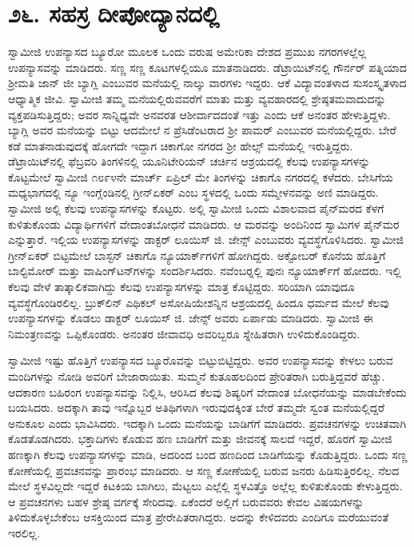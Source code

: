 
\chapter*{೨೬. ಸಹಸ್ರ ದೀಪೋದ್ಯಾನದಲ್ಲಿ}

 ಸ್ವಾಮೀಜಿ ಉಪನ್ಯಾಸದ ಬ್ಯೂರೋ ಮೂಲಕ ಒಂದು ವರುಷ ಅಮೇರಿಕಾ ದೇಶದ ಪ್ರಮುಖ ನಗರಗಳಲ್ಲೆಲ್ಲ ಉಪನ್ಯಾಸವನ್ನು ಮಾಡಿದರು. ಸಣ್ಣ ಸಣ್ಣ ಕೂಟಗಳಲ್ಲಿಯೂ ಮಾತನಾಡಿದರು. ಡೆಟ್ರಾಯಿಟ್‍ನಲ್ಲಿ ಗೌರ್ನರ್ ಪತ್ನಿಯಾದ ಶ‍್ರೀಮತಿ ಜಾನ್ ಜೀ ಬ್ಯಾಗ್ಲಿ ಎಂಬುವರ ಮನೆಯಲ್ಲಿ ನಾಲ್ಕು ವಾರಗಳು ಇದ್ದರು. ಆಕೆ ವಿದ್ಯಾವಂತಳಾದ ಸುಸಂಸ್ಕೃತಳಾದ ಆಧ್ಯಾತ್ಮಿಕ ಜೀವಿ. ಸ್ವಾಮೀಜಿ ತಮ್ಮ ಮನೆಯಲ್ಲಿರುವವರೆಗೆ ಮಾತು ಮತ್ತು ವ್ಯವಹಾರದಲ್ಲಿ ಶ್ರೇಷ್ಠತಮವಾದುದನ್ನು ವ್ಯಕ್ತಪಡಿಸುತ್ತಿದ್ದರು; ಅವರ ಸಾನ್ನಿಧ್ಯವೇ ಅನವರತ ಆಶೀರ್ವಾದದಂತೆ ಇತ್ತು ಎಂದು ಆಕೆ ಅನಂತರ ಹೇಳುತ್ತಿದ್ದಳು. ಬ್ಯಾಗ್ಲಿ ಅವರ ಮನೆಯನ್ನು ಬಿಟ್ಟು ಆದಮೇಲೆ ನ ಪ್ರೆಸಿಡೆಂಟರಾದ ಶ‍್ರೀ ಪಾಮರ್ ಎಂಬುವರ ಮನೆಯಲ್ಲಿದ್ದರು. ಬೇರೆ ಕಡೆ ಮಾತನಾಡುವುದಕ್ಕೆ ಹೋಗದೇ ಇದ್ದಾಗ ಚಿಕಾಗೋ ನಗರದ ಶ‍್ರೀ ಹೇಲ್ಸ್ ಮನೆಯಲ್ಲಿ ಇರುತ್ತಿದ್ದರು. ಡೆಟ್ರಾಯಿಟ್‍ನಲ್ಲಿ ಫೆಬ್ರವರಿ ತಿಂಗಳಿನಲ್ಲಿ ಯೂನಿಟೇರಿಯನ್ ಚರ್ಚಿನ ಆಶ್ರಯದಲ್ಲಿ ಕೆಲವು ಉಪನ್ಯಾಸಗಳನ್ನು ಕೊಟ್ಟಮೇಲೆ ಸ್ವಾಮೀಜಿ ೧೮೯೪ನೇ ಮಾರ್ಚ್ ಏಪ್ರಿಲ್ ಮೇ ತಿಂಗಳನ್ನು ಚಿಕಾಗೊ ನಗರದಲ್ಲಿ ಕಳೆದರು. ಬೇಸಿಗೆಯ ಮಧ್ಯಭಾಗದಲ್ಲಿ ನ್ಯೂ ಇಂಗ್ಲೆಂಡಿನಲ್ಲಿ ಗ್ರೀನ್‍ಏಕರ್ ಎಂಬ ಸ್ಥಳದಲ್ಲಿ ಒಂದು ಸಮ್ಮೇಳನವನ್ನು ಅಣಿ ಮಾಡಿದ್ದರು. ಸ್ವಾಮೀಜಿ ಅಲ್ಲಿ ಕೆಲವು ಉಪನ್ಯಾಸಗಳನ್ನು ಕೊಟ್ಟರು. ಅಲ್ಲಿ ಸ್ವಾಮೀಜಿ ಒಂದು ವಿಶಾಲವಾದ ಪೈನ್‍ಮರದ ಕೆಳಗೆ ಕುಳಿತುಕೊಂಡು ವಿದ್ಯಾರ್ಥಿಗಳಿಗೆ ವೇದಾಂತಬೋಧನೆ ಮಾಡಿದರು. ಆ ಮರವನ್ನು ಅಂದಿನಿಂದ ಸ್ವಾಮಿಗಳ ಪೈನ್‍ಮರ ಎನ್ನುತ್ತಾರೆ. ಇಲ್ಲಿಯ ಉಪನ್ಯಾಸಗಳನ್ನು ಡಾಕ್ಟರ್ ಲೂಯಿಸ್ ಜಿ. ಜೇನ್ಸ್ ಎಂಬುವರು ವ್ಯವಸ್ಥೆಗೊಳಿಸಿದರು. ಸ್ವಾಮೀಜಿ ಗ್ರೀನ್‍ಏಕರ್ ಬಿಟ್ಟಮೇಲೆ ಬಾಸ್ಟನ್ ಚಿಕಾಗೊ ನ್ಯೂಯಾರ್ಕ್‍ಗಳಿಗೆ ಹೋಗಿದ್ದರು. ಅಕ್ಟೋಬರ್ ಕೊನೆಯ ಹೊತ್ತಿಗೆ ಬಾಲ್ಟಿಮೋರ್ ಮತ್ತು ವಾಷಿಂಗ್‍ಟನ್‍ಗಳನ್ನು ಸಂದರ್ಶಿಸಿದರು. ನವೆಂಬರ್‍ನಲ್ಲಿ ಪುನಃ ನ್ಯೂಯಾರ್ಕ್‍ಗೆ ಹೋದರು. ಇಲ್ಲಿ ಕೆಲವು ವೇಳೆ ತಾತ್ಕಾಲಿಕವಾಗಿದ್ದು ಕೆಲವು ಉಪನ್ಯಾಸಗಳನ್ನು ಮಾತ್ರ ಕೊಟ್ಟಿದ್ದರು. ಸರಿಯಾಗಿ ಯಾವುದೂ ವ್ಯವಸ್ಥೆಗೊಂಡಿರಲಿಲ್ಲ. ಬ್ರುಕ್‍ಲಿನ್ ಎಥಿಕಲ್ ಅಸೋಷಿಯೇಶನ್ನಿನ ಆಶ್ರಯದಲ್ಲಿ ಹಿಂದೂ ಧರ್ಮದ ಮೇಲೆ ಕೆಲವು ಉಪನ್ಯಾಸಗಳನ್ನು ಕೊಡಲು ಡಾಕ್ಟರ್ ಲೂಯಿಸ್ ಜಿ. ಜೇನ್ಸ್ ಅವರು ಏರ್ಪಾಡು ಮಾಡಿದರು. ಸ್ವಾಮೀಜಿ ಈ ನಿಮಂತ್ರಣವನ್ನು ಒಪ್ಪಿಕೊಂಡರು. ಅನಂತರ ಜೀವಾವಧಿ ಅವರಿಬ್ಬರೂ ಸ್ನೇಹಿತರಾಗಿ ಉಳಿದುಕೊಂಡಿದ್ದರು. 

 ಸ್ವಾಮೀಜಿ ಇಷ್ಟು ಹೊತ್ತಿಗೆ ಉಪನ್ಯಾಸದ ಬ್ಯೂರೊವನ್ನು ಬಿಟ್ಟುಬಿಟ್ಟಿದ್ದರು. ಅವರ ಉಪನ್ಯಾಸವನ್ನು ಕೇಳಲು ಬರುವ ಮಂದಿಗಳನ್ನು ನೋಡಿ ಅವರಿಗೆ ಬೇಜಾರಾಯಿತು. ಸುಮ್ಮನೆ ಕುತೂಹಲದಿಂದ ಪ್ರೇರಿತರಾಗಿ ಬರುತ್ತಿದ್ದವರೆ ಹೆಚ್ಚು. ಆದಕಾರಣ ಬಹಿರಂಗ ಉಪನ್ಯಾಸವನ್ನು ನಿಲ್ಲಿಸಿ, ಆರಿಸಿದ ಕೆಲವು ಶಿಷ್ಯರಿಗೆ ವೇದಾಂತ ಬೋಧನೆಯನ್ನು ಮಾಡಬೇಕೆಂದು ಬಯಸಿದರು. ಅದಕ್ಕಾಗಿ ತಾವು ಇನ್ನೊಬ್ಬರ ಅತಿಥಿಗಳಾಗಿ ಇರುವುದಕ್ಕಿಂತ ಬೇರೆ ತಮ್ಮದೇ ಸ್ವಂತ ಮನೆಯಲ್ಲಿದ್ದರೆ ಅನುಕೂಲ ಎಂದು ಭಾವಿಸಿದರು. ಇದಕ್ಕಾಗಿ ಒಂದು ಮನೆಯನ್ನು ಬಾಡಿಗೆಗೆ ಮಾಡಿದರು. ಪ್ರವಚನಗಳನ್ನು ಉಚಿತವಾಗಿ ಕೊಡತೊಡಗಿದರು. ಭಕ್ತಾದಿಗಳು ಕೊಡುವ ಹಣ ಬಾಡಿಗೆಗೆ ಮತ್ತು ಜೀವನಕ್ಕೆ ಸಾಲದೆ ಇದ್ದರೆ, ಹೊರಗೆ ಸ್ವಾಮೀಜಿ ಹಣಕ್ಕಾಗಿ ಕೆಲವು ಉಪನ್ಯಾಸಗಳನ್ನು ಮಾಡಿ, ಅದರಿಂದ ಬಂದ ಹಣದಿಂದ ಬಾಡಿಗೆಯನ್ನು ಕೊಡುತ್ತಿದ್ದರು. ಒಂದು ಸಣ್ಣ ಕೋಣೆಯಲ್ಲಿ ಪ್ರವಚನವನ್ನು ಪ್ರಾರಂಭ ಮಾಡಿದರು. ಆ ಸಣ್ಣ ಕೋಣೆಯಲ್ಲಿ ಬರುವ ಜನರು ಹಿಡಿಸುತ್ತಿರಲಿಲ್ಲ. ನೆಲದ ಮೇಲೆ ಸ್ಥಳವಿಲ್ಲದೇ ಇದ್ದರೆ ಕಿಟಕಿಯ ಬಾಗಿಲು, ಮೆಟ್ಟಲು ಎಲ್ಲೆಲ್ಲಿ ಸ್ಥಳವಿತ್ತೊ ಅಲ್ಲೆಲ್ಲ ಕುಳಿತುಕೊಂಡು ಕೇಳುತ್ತಿದ್ದರು. ಆ ಪ್ರವಚನಗಳು ಬಹಳ ಶ್ರೇಷ್ಠ ವರ್ಗಕ್ಕೆ ಸೇರಿದವು. ಏಕೆಂದರೆ ಅಲ್ಲಿಗೆ ಬರುವವರು ಕೇವಲ ವಿಷಯಗಳನ್ನು ತಿಳಿದುಕೊಳ್ಳಬೇಕೆಂಬ ಆಸಕ್ತಿಯಿಂದ ಮಾತ್ರ ಪ್ರೇರೇಪಿತರಾಗಿದ್ದರು. ಅದನ್ನು ಕೇಳಿದವರು ಎಂದಿಗೂ ಮರೆಯುವಂತೆ ಇರಲಿಲ್ಲ. 

